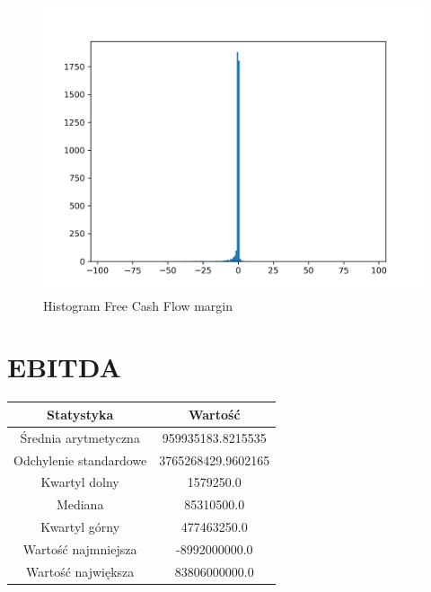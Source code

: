 \documentclass{article}
\begin{document}
\begin{figure}[h!]
    \includegraphics[width=\linewidth]{variables/Free Cash Flow margin.png}
    \caption{Histogram Free Cash Flow margin }
\end{figure}\section{ EBITDA }

\begin{center}
    \begin{tabular}{|c | c|} 
    \hline
    Statystyka & Wartość \\
    \hline\hline
    Średnia arytmetyczna & 959935183.8215535 \\ 
    \hline
    Odchylenie standardowe & 3765268429.9602165 \\
    \hline
    Kwartyl dolny & 1579250.0 \\
    \hline
    Mediana & 85310500.0 \\
    \hline
    Kwartyl górny & 477463250.0 \\
    \hline
    Wartość najmniejsza & -8992000000.0 \\
    \hline
    Wartość największa & 83806000000.0 \\
    \hline
   \end{tabular}
\end{center}
\end{document}
